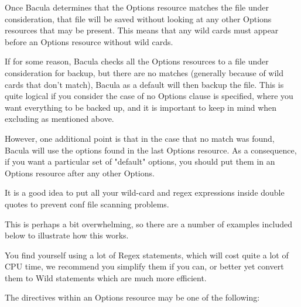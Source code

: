 Once Bacula determines that the Options resource matches the file under
consideration, that file will be saved without looking at any other Options
resources that may be present.  This means that any wild cards must appear
before an Options resource without wild cards.

If for some reason, Bacula checks all the Options resources to a file under
consideration for backup, but there are no matches (generally because of wild
cards that don't match), Bacula as a default will then backup the file.  This
is quite logical if you consider the case of no Options clause is specified,
where you want everything to be backed up, and it is important to keep in mind
when excluding as mentioned above.

However, one additional point is that in the case that no match was found,
Bacula will use the options found in the last Options resource.  As a
consequence, if you want a particular set of "default" options, you should put
them in an Options resource after any other Options.

It is a good idea to put all your wild-card and regex expressions inside
double quotes to prevent conf file scanning problems.

This is perhaps a bit overwhelming, so there are a number of examples included 
below to illustrate how this works.

You find yourself using a lot of Regex statements, which will cost quite a lot
of CPU time, we recommend you simplify them if you can, or better yet
convert them to Wild statements which are much more efficient.

The directives within an Options resource may be one of the following: 

